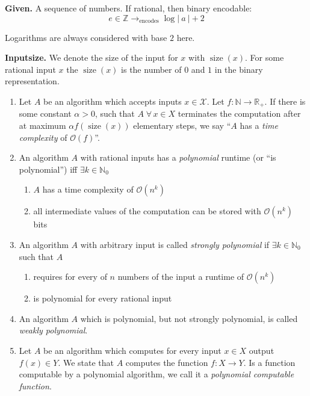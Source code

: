 \documentclass[a4paper]{article}
\theoremstyle{definition}
\newcommand{\card}[1]{\left|\:\!#1\:\!\right|}
\newcommand{\given}[1]{\textbf{Given.} #1\par}
\newcommand{\fall}{\;\forall\,}
\begin{document}
\given{A sequence of numbers. If rational, then binary encodable:
\[
  e \in \mathbb{Z} \rightarrow_{\text{encodes}} \log{\card{a} + 2}
\]}

Logarithms are always considered with base $2$ here.

\textbf{Inputsize.} We denote the size of the input for $x$ with $\operatorname{size}(x)$. For some rational input $x$ the $\operatorname{size}(x)$ is the number of $0$ and $1$ in the binary representation.

\begin{enumerate}
  \item Let $A$ be an algorithm which accepts inputs $x \in \mathcal{X}$. Let $f: \mathbb{N} \rightarrow \mathbb{R}_+$. If there is some constant $\alpha > 0$, such that $A \fall x \in X$ terminates the computation after at maximum $\alpha f(\operatorname{size}(x))$ elementary steps, we say ``$A$ has a \emph{time complexity} of $\mathcal{O}(f)$''.

  \item An algorithm $A$ with rational inputs has a \emph{polynomial} runtime (or \enquote{is polynomial}) iff $\exists k \in \mathbb N_0$
    \begin{enumerate}
      \item $A$ has a time complexity of $\mathcal{O}(n^k)$
      \item all intermediate values of the computation can be stored with $\mathcal{O}(n^k)$ bits
    \end{enumerate}

  \item An algorithm $A$ with arbitrary input is called \emph{strongly polynomial} if $\exists k \in \mathbb{N}_0$ such that $A$
    \begin{enumerate}
      \item requires for every of $n$ numbers of the input a runtime of $\mathcal{O}(n^k)$
      \item is polynomial for every rational input
    \end{enumerate}

  \item An algorithm $A$ which is polynomial, but not strongly polynomial, is called \emph{weakly polynomial}.

  \item Let $A$ be an algorithm which computes for every input $x \in X$ output $f(x) \in Y$. We state that $A$ computes the function $f: X \rightarrow Y$. Is a function computable by a polynomial algorithm, we call it a \emph{polynomial computable function}.
\end{enumerate}
\end{document}
